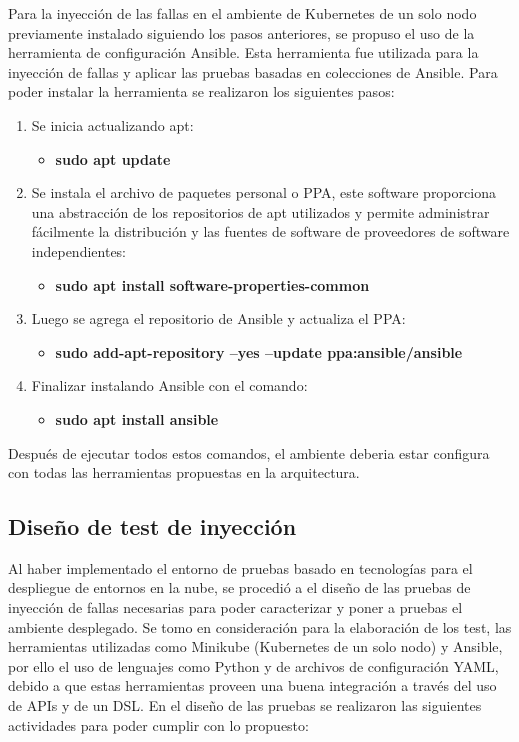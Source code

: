 \par Para la inyección de las fallas en el ambiente de Kubernetes de un solo nodo previamente instalado siguiendo los pasos anteriores, se propuso el uso de la herramienta de configuración  Ansible. Esta herramienta fue utilizada para la inyección de fallas y aplicar las pruebas basadas en colecciones de Ansible. Para poder instalar la herramienta se realizaron los siguientes pasos:
\begin{enumerate}
    \item Se inicia actualizando apt:
    \begin{itemize}
        \item \textbf{sudo apt update}
    \end{itemize}
    \item Se instala el archivo de paquetes personal o PPA, este software proporciona una abstracción de los repositorios de apt utilizados y permite administrar fácilmente la distribución y las fuentes de software de proveedores de software independientes:
    \begin{itemize}
        \item \textbf{sudo apt install software-properties-common}
    \end{itemize}
    \item Luego se agrega el repositorio de Ansible y actualiza el PPA:
    \begin{itemize}
        \item \textbf{sudo add-apt-repository --yes --update ppa:ansible/ansible}
    \end{itemize}
    \item Finalizar instalando Ansible con el comando:
    \begin{itemize}
        \item \textbf{sudo apt install ansible}
    \end{itemize}
\end{enumerate}

\par Después de ejecutar todos estos comandos, el ambiente deberia estar configura con todas las herramientas propuestas en la arquitectura.

\subsection{Diseño de test de inyección}
\par Al haber implementado el entorno de pruebas basado en tecnologías para el despliegue de entornos en la nube, se procedió a el diseño de las pruebas de inyección de fallas necesarias para poder caracterizar y poner a pruebas el ambiente desplegado. Se tomo en consideración para la elaboración de los test, las herramientas utilizadas como Minikube (Kubernetes de un solo nodo) y Ansible, por ello el uso de lenguajes como Python y de archivos de configuración YAML, debido a que estas herramientas proveen una buena integración  a través del uso de APIs y de un DSL. En el diseño de las pruebas se realizaron las siguientes actividades para poder cumplir con lo propuesto:

